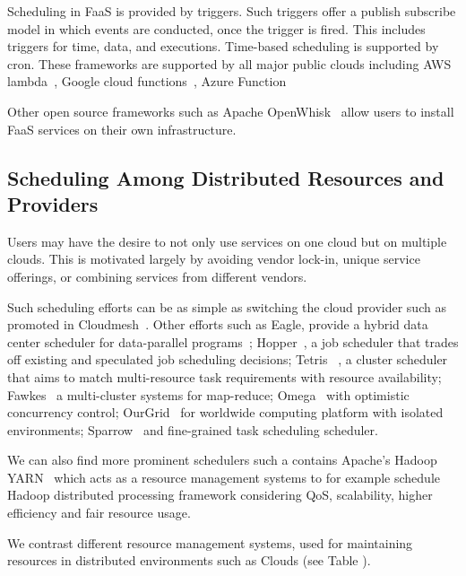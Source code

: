 \documentclass[final,5p,times,twocolumn]{elsarticle}
\begin{document}
Scheduling in FaaS is provided by triggers. Such triggers offer a
publish subscribe model in which events are conducted, once the
trigger is fired. This includes triggers for time, data, and
executions. Time-based scheduling is supported by cron.  These
frameworks are supported by all major public clouds including AWS
lambda~\cite{AWSlambda2018}, Google cloud
functions~\cite{GoogleCF2018}, Azure Function~\cite{Azure2018}

Other open source frameworks such as Apache
OpenWhisk~\cite{OpenWhisk2018} allow users to install FaaS services on
their own infrastructure.


\subsection{Scheduling Among Distributed Resources and Providers}
\label{sec:distributed}


Users may have the desire to not only use services on one cloud but on
multiple clouds. This is motivated largely by avoiding vendor lock-in,
unique service offerings, or combining services from different
vendors.

Such scheduling efforts can be as simple as switching the cloud
provider such as promoted in Cloudmesh~\cite{von2014accessing}.
Other efforts such as Eagle, provide a hybrid data center scheduler for
data-parallel programs~\cite{delgado2016job};
Hopper~\cite{ren2015hopper}, a job scheduler that trades off existing
and speculated job scheduling decisions; Tetris
~\cite{grandl2015multi}, a cluster scheduler that aims to match
multi-resource task requirements with resource availability;
Fawkes~\cite{ghit2014balanced} a multi-cluster systems for map-reduce;
Omega~\cite{schwarzkopf2013omega} with optimistic concurrency control;
OurGrid~\cite{andrade2003ourgrid,cirne2006labs} for worldwide
computing platform with isolated environments;
Sparrow~\cite{ousterhout2013sparrow} and fine-grained task scheduling
scheduler.
  
We can also find more prominent schedulers such a contains Apache's
Hadoop YARN~\cite{vavilapalli2013apache} which acts as a resource
management systems to for example schedule Hadoop distributed
processing framework considering QoS, scalability, higher efficiency
and fair resource usage.

We contrast different resource management systems, used for
maintaining resources in distributed environments such as Clouds (see
Table \label{T:distr-cloud}).


\end{document}
